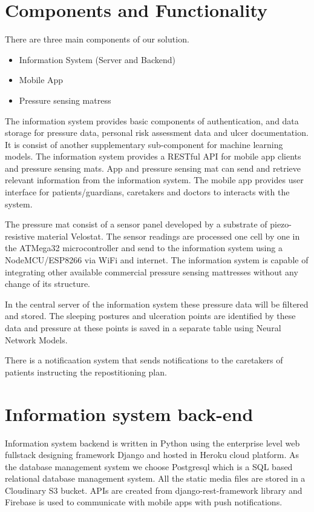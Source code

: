 \section{Components and Functionality}

There are three main components of our solution. 
\begin{itemize}
	\item Information System (Server and Backend)
	\item Mobile App
	\item Pressure sensing matress
\end{itemize}


The information system provides basic components of authentication, and data storage for pressure data, personal risk assessment data and ulcer documentation. It is consist of another supplementary sub-component for machine learning models. The information system provides a RESTful API for mobile app clients and pressure sensing mats. App and pressure sensing mat can send and retrieve relevant information from the information system. The mobile app provides user interface for patients/guardians, caretakers and doctors to interacts with the system.

The pressure mat consist of a sensor panel developed by a substrate of piezo-resistive material Velostat\textsuperscript{\textregistered}. The sensor readings are processed one cell by one in the ATMega32\textsuperscript{\textregistered} microcontroller and send to the information system using a NodeMCU/ESP8266\textsuperscript{\textregistered} via WiFi and internet. The information system is capable of integrating other available commercial pressure sensing mattresses without any change of its structure.

In the central server of the information system these pressure data will be filtered and stored. The sleeping postures and ulceration points are identified by these data and pressure at these points is saved in a separate table using Neural Network Models.

There is a notificaation system that sends notifications to the caretakers of patients instructing the repostitioning plan.


\section{Information system back-end}

Information system backend is written in Python using the enterprise level web fullstack designing framework Django\textsuperscript{\textregistered} and hosted in Heroku\textsuperscript{\textregistered} cloud platform. As the database management system we choose Postgresql which is a SQL based relational database management system. All the static media files are stored in a Cloudinary S3 bucket\textsuperscript{\textregistered}. APIs are created from django-rest-framework library and Firebase\textsuperscript{\textregistered} is used to communicate with mobile apps with push notifications. 


